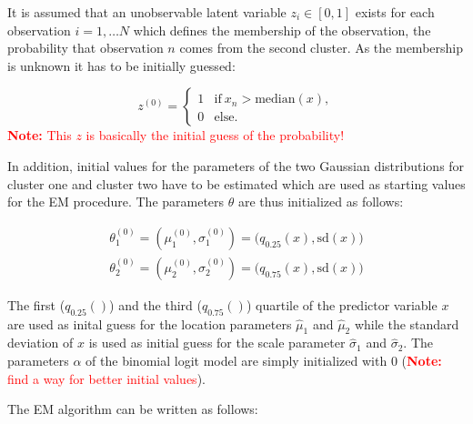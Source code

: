 \documentclass[article,nojss,shortnames]{jss}
\newcommand{\note}[1]{\textcolor{red}{\textbf{Note:} #1}}
\begin{document}
It is assumed that an unobservable latent variable $z_i \in [0,1]$ exists
for each observation $i=1, \dots N$ which defines the membership of the observation,
the probability that observation $n$ comes from the second cluster.
As the membership is unknown it has to be initially guessed:

\begin{equation}
    \mathit{z}^{(0)} = \begin{cases}
        1 & \text{if}~x_n > \text{median}(x), \\
        0 & \text{else}.
    \end{cases}
    \label{eqn:init-zn}
\end{equation}
\note{This $z$ is basically the initial guess of the probability!}

In addition, initial values for the parameters of the two Gaussian distributions
for cluster one and cluster two have to be estimated which are used as starting
values for the EM procedure. The parameters $\mathit{\theta}$ are thus initialized
as follows:

\begin{equation}
    \begin{split}
        \mathit{\theta}_1^{(0)} = (\mu_1^{(0)}, \sigma_1^{(0)}) = \Big(q_{0.25}(x), \text{sd}(x)\Big) \\
        \mathit{\theta}_2^{(0)} = (\mu_2^{(0)}, \sigma_2^{(0)}) = \Big(q_{0.75}(x), \text{sd}(x)\Big)
    \end{split}
    \label{eqn:init-theta}
\end{equation}

The first ($q_{0.25}()$) and the third ($q_{0.75}()$) quartile of the predictor 
variable $\mathit{x}$ are used as inital guess for the location parameters
$\hat{\mu}_1$ and $\hat{\mu}_2$ while the standard deviation of $\mathit{x}$ is used as initial
guess for the scale parameter $\hat{\sigma}_1$ and $\hat{\sigma}_2$.
The parameters $\mathit{\alpha}$ of the binomial logit model are simply initialized
with $0$ (\note{find a way for better initial values}).



The EM algorithm can be written as follows:
\end{document}
